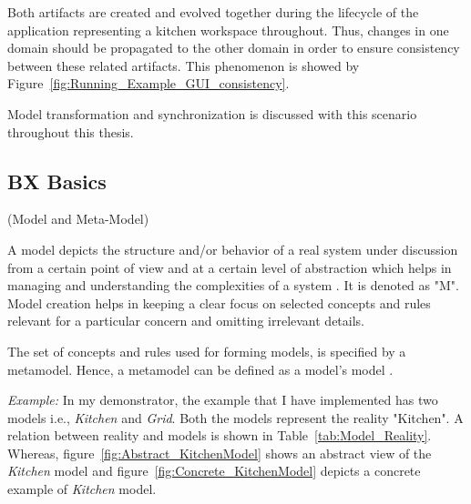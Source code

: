 Both artifacts are created and evolved together during the lifecycle of the application representing a kitchen workspace throughout. Thus, changes in one domain should be propagated to the other domain in order to ensure consistency between these related artifacts. This phenomenon is showed by Figure~\ref{fig:Running_Example_GUI_consistency}.

Model transformation and synchronization is discussed with this scenario throughout this thesis. 

\subsection{BX Basics}\label{subsec:definitions}

\begin{defn}\label{defModel} (Model and Meta-Model) \end{defn} 
A model depicts the structure and/or behavior of a real system under discussion from a certain point of view and at a certain level of abstraction which helps in managing and understanding the complexities of a system \cite{uml} \cite{mdsd}. It is denoted as "M". Model creation helps in keeping a clear focus on selected concepts and rules relevant for a particular concern and omitting irrelevant details.

The set of concepts and rules used for forming models, is specified by a metamodel. Hence, a metamodel can be defined as a model's model \cite{mdsd}. 

\textit{Example:} In my demonstrator, the example that I have implemented has two models i.e., \textit{Kitchen} and \textit{Grid}. Both the models represent the reality "Kitchen". A relation between reality and models is shown in Table~\ref{tab:Model_Reality}. Whereas, figure~\ref{fig:Abstract_KitchenModel} shows an abstract view of the \textit{Kitchen} model and figure~\ref{fig:Concrete_KitchenModel} depicts a concrete example of \textit{Kitchen} model.\\

